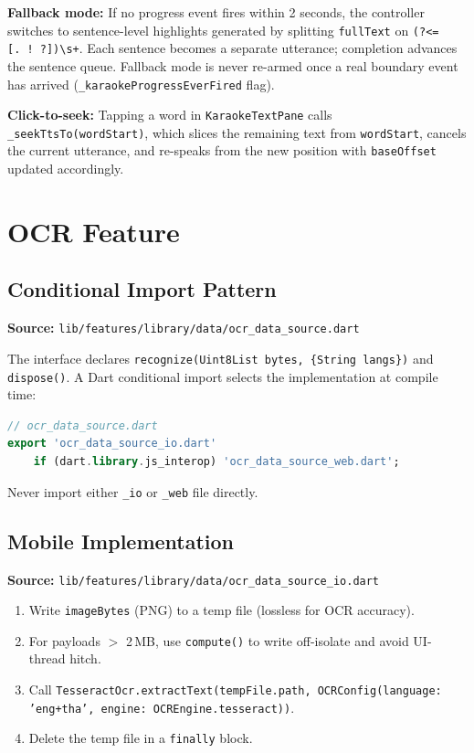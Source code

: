 \documentclass[11pt,a4paper]{article}
\begin{document}
\textbf{Fallback mode:} If no progress event fires within 2 seconds, the controller
switches to sentence-level highlights generated by splitting \texttt{fullText} on
\texttt{(?<=[.\,!\,?])\textbackslash{}s+}. Each sentence becomes a separate utterance;
completion advances the sentence queue. Fallback mode is never re-armed once a real
boundary event has arrived (\texttt{\_karaokeProgressEverFired} flag).

\textbf{Click-to-seek:} Tapping a word in \texttt{KaraokeTextPane} calls
\texttt{\_seekTtsTo(wordStart)}, which slices the remaining text from \texttt{wordStart},
cancels the current utterance, and re-speaks from the new position with
\texttt{baseOffset} updated accordingly.

\section{OCR Feature}

\subsection{Conditional Import Pattern}

\textbf{Source:} \texttt{lib/features/library/data/ocr\_data\_source.dart}

The interface declares \texttt{recognize(Uint8List bytes, \{String langs\})} and
\texttt{dispose()}. A Dart conditional import selects the implementation at compile time:

\begin{lstlisting}[language=Dart]
// ocr_data_source.dart
export 'ocr_data_source_io.dart'
    if (dart.library.js_interop) 'ocr_data_source_web.dart';
\end{lstlisting}

Never import either \texttt{\_io} or \texttt{\_web} file directly.

\subsection{Mobile Implementation}

\textbf{Source:} \texttt{lib/features/library/data/ocr\_data\_source\_io.dart}

\begin{enumerate}
  \item Write \texttt{imageBytes} (PNG) to a temp file (lossless for OCR accuracy).
  \item For payloads $>$ 2\,MB, use \texttt{compute()} to write off-isolate and avoid
    UI-thread hitch.
  \item Call \texttt{TesseractOcr.extractText(tempFile.path,
    OCRConfig(language: 'eng+tha', engine: OCREngine.tesseract))}.
  \item Delete the temp file in a \texttt{finally} block.
\end{enumerate}
\end{document}
